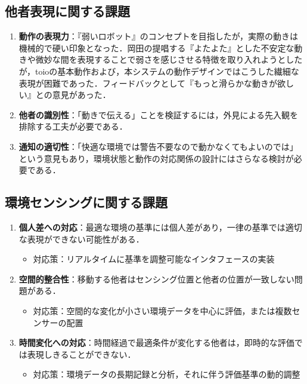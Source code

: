 \documentclass{cuxarticle}
\begin{document}
\subsection{他者表現に関する課題}
\begin{enumerate}
  \item \textbf{動作の表現力}：『弱いロボット』のコンセプトを目指したが，実際の動きは機械的で硬い印象となった．岡田の提唱する『よたよた』とした不安定な動きや微妙な間を表現することで弱さを感じさせる特徴を取り入れようとしたが，toioの基本動作および，本システムの動作デザインではこうした繊細な表現が困難であった．フィードバックとして『もっと滑らかな動きが欲しい』との意見があった．

  \item \textbf{他者の識別性}：「動きで伝える」ことを検証するには，外見による先入観を排除する工夫が必要である．

  \item \textbf{通知の適切性}：「快適な環境では警告不要なので動かなくてもよいのでは」という意見もあり，環境状態と動作の対応関係の設計にはさらなる検討が必要である．
\end{enumerate}

\subsection{環境センシングに関する課題}
\begin{enumerate}
  \item \textbf{個人差への対応}：最適な環境の基準には個人差があり，一律の基準では適切な表現ができない可能性がある．
    \begin{itemize}
      \item 対応策：リアルタイムに基準を調整可能なインタフェースの実装
    \end{itemize}

  \item \textbf{空間的整合性}：移動する他者はセンシング位置と他者の位置が一致しない問題がある．
    \begin{itemize}
      \item 対応策：空間的な変化が小さい環境データを中心に評価，または複数センサーの配置
    \end{itemize}

  \item \textbf{時間変化への対応}：時間経過で最適条件が変化する他者は，即時的な評価では表現しきることができない．
    \begin{itemize}
      \item 対応策：環境データの長期記録と分析，それに伴う評価基準の動的調整
    \end{itemize}
\end{enumerate}
\end{document}
